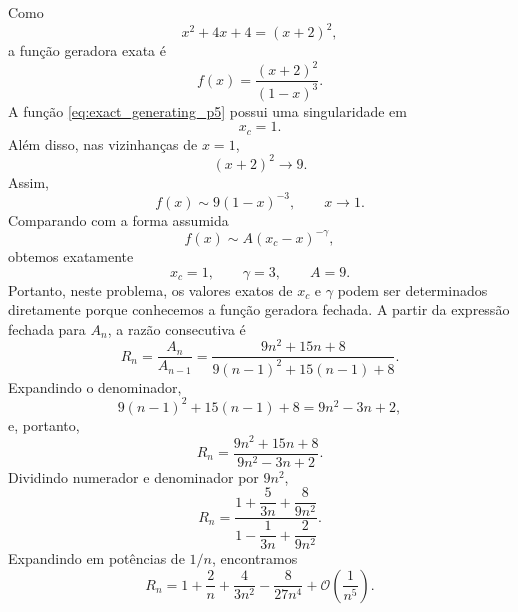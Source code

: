\documentclass[11pt,a4paper]{article}
\begin{document}
%
Como
%
\begin{equation}
    x^2+4x+4=(x+2)^2,
\end{equation}
%
a função geradora exata é
%
\begin{equation}
    f(x)=\frac{(x+2)^2}{(1-x)^3}.    \label{eq:exact_generating_p5}
\end{equation}
%
A função \eqref{eq:exact_generating_p5} possui uma singularidade em
%
\begin{equation}
    x_c=1.
\end{equation}
%
Além disso, nas vizinhanças de $x=1$,
%
\begin{equation}
    (x+2)^2\longrightarrow9.
\end{equation}
%
Assim,
%
\begin{equation}
    f(x)
    \sim
    9(1-x)^{-3},
    \qquad
    x\to1.
\end{equation}
%
Comparando com a forma assumida
%
\begin{equation}
    f(x)\sim A(x_c-x)^{-\gamma},
\end{equation}
%
obtemos exatamente
%
\begin{equation}
    \boxed{
    x_c=1,
    \qquad
    \gamma=3,
    \qquad
    A=9.
    }
    \label{eq:exact_results_p5}
\end{equation}
%
Portanto, neste problema, os valores exatos de $x_c$ e $\gamma$ podem
ser determinados diretamente porque conhecemos a função geradora
fechada. A partir da expressão fechada para $A_n$, a razão consecutiva é
%
\begin{equation}
    R_n
    =
    \frac{A_n}{A_{n-1}}
    =
    \frac{
        9n^2+15n+8
    }{
        9(n-1)^2+15(n-1)+8
    }.
\end{equation}
%
Expandindo o denominador,
%
\begin{equation}
    9(n-1)^2+15(n-1)+8
    =
    9n^2-3n+2,
\end{equation}
%
e, portanto,
%
\begin{equation}
    R_n
    =
    \frac{9n^2+15n+8}
         {9n^2-3n+2}.
    \label{eq:R_exact_p5}
\end{equation}
%
Dividindo numerador e denominador por $9n^2$,
%
\begin{equation}
    R_n
    =
    \frac{
        1+\dfrac{5}{3n}+\dfrac{8}{9n^2}
    }{
        1-\dfrac{1}{3n}+\dfrac{2}{9n^2}
    }.
\end{equation}
%
Expandindo em potências de $1/n$, encontramos
%
\begin{equation}
    R_n
    =
    1
    +
    \frac{2}{n}
    +
    \frac{4}{3n^2}
    -
    \frac{8}{27n^4}
    +
    \mathcal O\left(\frac{1}{n^5}\right).    \label{eq:R_exact_asympt_p5}
\end{equation}
\end{document}

